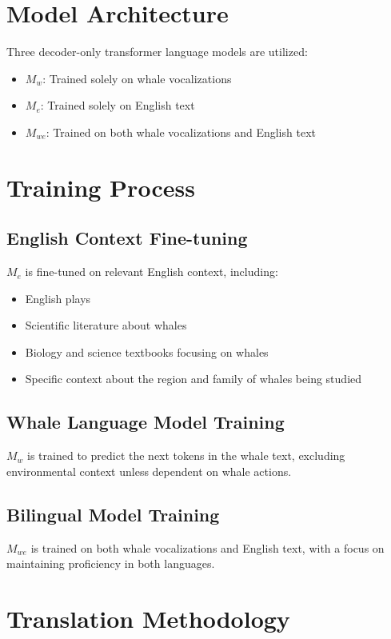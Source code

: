 \documentclass{article}
\begin{document}
\section{Model Architecture}
Three decoder-only transformer language models are utilized:

\begin{itemize}
    \item $M_w$: Trained solely on whale vocalizations
    \item $M_e$: Trained solely on English text
    \item $M_{we}$: Trained on both whale vocalizations and English text
\end{itemize}

\section{Training Process}
\subsection{English Context Fine-tuning}
$M_e$ is fine-tuned on relevant English context, including:
\begin{itemize}
    \item English plays
    \item Scientific literature about whales
    \item Biology and science textbooks focusing on whales
    \item Specific context about the region and family of whales being studied
\end{itemize}

\subsection{Whale Language Model Training}
$M_w$ is trained to predict the next tokens in the whale text, excluding environmental context unless dependent on whale actions.

\subsection{Bilingual Model Training}
$M_{we}$ is trained on both whale vocalizations and English text, with a focus on maintaining proficiency in both languages.

\section{Translation Methodology}
\end{document}
